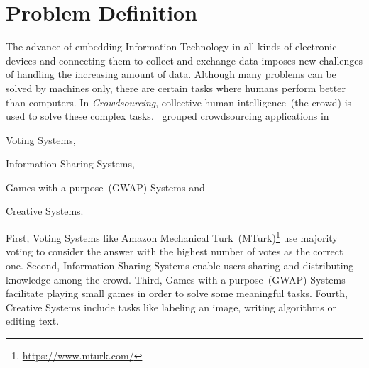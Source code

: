 \documentclass[oneside,a4paper,11pt]{memoir}
\begin{document}
\setlength{\parindent}{\thisparindent}%
\setlength{\baselineskip}{\thisbaselineskip}%
\setlength{\parskip}{\thisparskip}%
\restoregeometry





\section{Problem Definition}
The advance of embedding Information Technology in all kinds of electronic devices and connecting them to collect and exchange data imposes new challenges of handling the increasing amount of data. Although many problems can be solved by machines only, there are certain tasks where humans perform better than computers. In \emph{Crowdsourcing}, collective human intelligence~(the crowd) is used to solve these complex tasks. \citet{yuen2011survey}~grouped crowdsourcing applications in 
\begin{inparaenum}[1)]
		\item Voting Systems,
		\item Information Sharing Systems,
		\item Games with a purpose~(GWAP) Systems and
		\item Creative Systems.
\end{inparaenum} 
First, Voting Systems like Amazon Mechanical Turk~(MTurk)\footnote{\url{https://www.mturk.com/}} use majority voting to consider the answer with the highest number of votes as the correct one. Second, Information Sharing Systems enable users sharing and distributing knowledge among the crowd. Third, Games with a purpose~(GWAP) Systems facilitate playing small games in order to solve some meaningful tasks. Fourth, Creative Systems include tasks like labeling an image, writing algorithms or editing text. 
\end{document}

